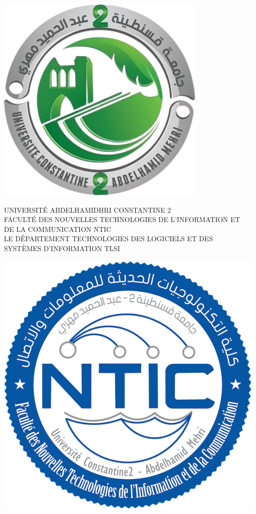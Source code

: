 \documentclass[12pt,a4paper]{article}
\begin{document}
\begin{titlepage}
    \begin{minipage}{0.15\textwidth}
        \includegraphics[width=\linewidth]{Logo/university-logo.png}
    \end{minipage}
    \begin{minipage}{0.625\textwidth}
        \centering
        \MakeUppercase{
            Université Abdelhamidhri Constantine 2\\
            Faculté des Nouvelles Technologies de l'Information et de la Communication NTIC\\
            Le Département Technologies des Logiciels et des Systèmes d'Information TLSI
        }
    \end{minipage}
    \begin{minipage}{0.15\textwidth}
        \includegraphics[width=\linewidth]{Logo/ntic-logo.png}

\end{minipage}
\end{titlepage}
\end{document}
